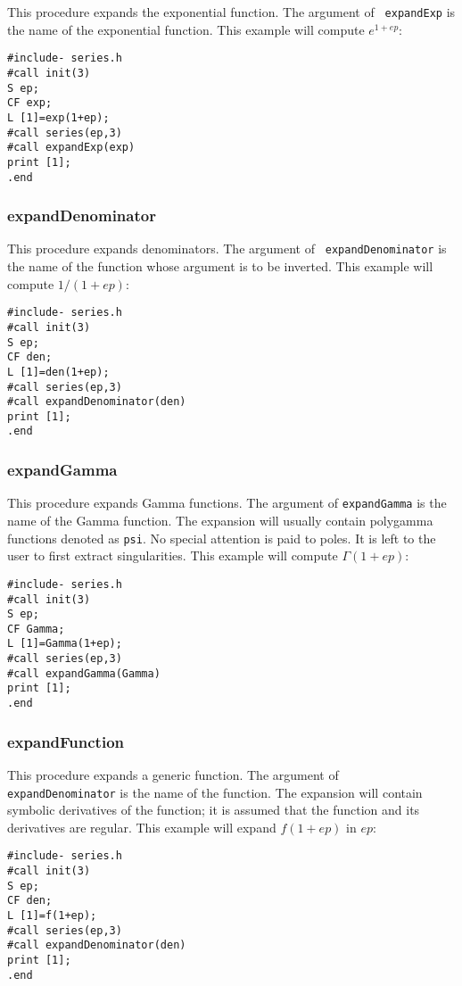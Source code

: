 \documentclass{article}
\begin{document}
This procedure expands the exponential function. The argument of {\tt
expandExp} is the name of the exponential function. This example will
compute $e^{1+ep}$:
\begin{verbatim}
#include- series.h
#call init(3)
S ep;
CF exp;
L [1]=exp(1+ep);
#call series(ep,3)
#call expandExp(exp)
print [1];
.end
\end{verbatim}

\subsubsection{expandDenominator}
\label{sec:inv_fun}

This procedure expands denominators. The argument of {\tt
expandDenominator} is the name of the function whose argument is to be
inverted. This example will compute $1/(1+ep)$:
\begin{verbatim}
#include- series.h
#call init(3)
S ep;
CF den;
L [1]=den(1+ep);
#call series(ep,3)
#call expandDenominator(den)
print [1];
.end
\end{verbatim}

\subsubsection{expandGamma}
\label{sec:exp_Gamma}

This procedure expands Gamma functions. The argument of {\tt expandGamma} is
the name of the Gamma function. The expansion will usually contain polygamma
functions denoted as {\tt psi}. No special attention is paid to
poles. It is left to the user to first extract singularities.
This example will compute $\Gamma(1+ep)$:
\begin{verbatim}
#include- series.h
#call init(3)
S ep;
CF Gamma;
L [1]=Gamma(1+ep);
#call series(ep,3)
#call expandGamma(Gamma)
print [1];
.end
\end{verbatim}

\subsubsection{expandFunction}
\label{sec:inv_fun}

This procedure expands a generic function. The argument of {\tt
expandDenominator} is the name of the function. The expansion will
contain symbolic derivatives of the function; it is assumed that the
function and its derivatives are regular.
This example will expand $f(1+ep)$ in $ep$:
\begin{verbatim}
#include- series.h
#call init(3)
S ep;
CF den;
L [1]=f(1+ep);
#call series(ep,3)
#call expandDenominator(den)
print [1];
.end
\end{verbatim}
\end{document}
